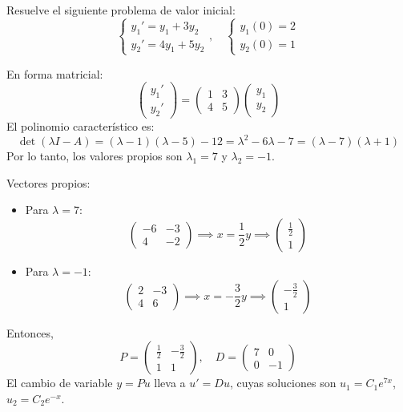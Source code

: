 \begin{example}
Resuelve el siguiente problema de valor inicial:
\[
\begin{cases}
y_1' = y_1 + 3y_2 \\
y_2' = 4y_1 + 5y_2
\end{cases}, \quad
\begin{cases}
y_1(0) = 2 \\
y_2(0) = 1
\end{cases}
\]
\begin{myproof}
En forma matricial:
\[
\begin{pmatrix}
y_1' \\ y_2'
\end{pmatrix}
=
\begin{pmatrix}
1 & 3 \\
4 & 5
\end{pmatrix}
\begin{pmatrix}
y_1 \\ y_2
\end{pmatrix}
\]
El polinomio característico es:
\[
\det(\lambda I - A) = (\lambda - 1)(\lambda - 5) - 12 = \lambda^2 - 6\lambda - 7 = (\lambda - 7)(\lambda + 1)
\]
Por lo tanto, los valores propios son $\lambda_1 = 7$ y $\lambda_2 = -1$.

Vectores propios:
\begin{itemize}
    \item Para $\lambda = 7$:
    \[
    \begin{pmatrix}
    -6 & -3 \\
    4 & -2
    \end{pmatrix}
    \implies x = \frac{1}{2}y \implies \begin{pmatrix} \frac{1}{2} \\ 1 \end{pmatrix}
    \]
    \item Para $\lambda = -1$:
    \[
    \begin{pmatrix}
    2 & -3 \\
    4 & 6
    \end{pmatrix}
    \implies x = -\frac{3}{2} y \implies \begin{pmatrix} -\frac{3}{2} \\ 1 \end{pmatrix}
    \]
\end{itemize}
Entonces,
\[
P = \begin{pmatrix} \frac{1}{2} & -\frac{3}{2} \\ 1 & 1 \end{pmatrix}, \quad D = \begin{pmatrix} 7 & 0 \\ 0 & -1 \end{pmatrix}
\]
El cambio de variable $y = P u$ lleva a $u' = D u$, cuyas soluciones son $u_1 = C_1 e^{7x}$, $u_2 = C_2 e^{-x}$.


\end{myproof}
\end{example}
